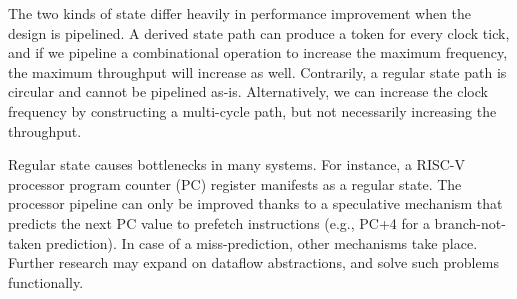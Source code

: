 The two kinds of state differ heavily in performance improvement when the design is pipelined. A derived state path can produce a token for every clock tick, and if we pipeline a combinational operation to increase the maximum frequency, the maximum throughput will increase as well. Contrarily, a regular state path is circular and cannot be pipelined as-is. Alternatively, we can increase the clock frequency by constructing a multi-cycle path, but not necessarily increasing the throughput.

Regular state causes bottlenecks in many systems. For instance, a RISC-V processor program counter (PC) register manifests as a regular state. The processor pipeline can only be improved thanks to a speculative mechanism that predicts the next PC value to prefetch instructions (e.g., PC+4 for a branch-not-taken prediction). In case of a miss-prediction, other mechanisms take place. Further research may expand on dataflow abstractions, and solve such problems functionally.



